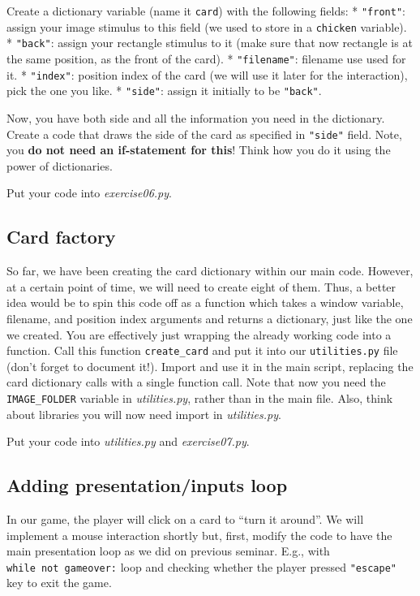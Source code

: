\documentclass[
]{book}
\begin{document}
Create a dictionary variable (name it \texttt{card}) with the following fields:
* \texttt{"front"}: assign your image stimulus to this field (we used to store in a \texttt{chicken} variable).
* \texttt{"back"}: assign your rectangle stimulus to it (make sure that now rectangle is at the same position, as the front of the card).
* \texttt{"filename"}: filename use used for it.
* \texttt{"index"}: position index of the card (we will use it later for the interaction), pick the one you like.
* \texttt{"side"}: assign it initially to be \texttt{"back"}.

Now, you have both side and all the information you need in the dictionary. Create a code that draws the side of the card as specified in \texttt{"side"} field. Note, you \textbf{do not need an if-statement for this}! Think how you do it using the power of dictionaries.

Put your code into \emph{exercise06.py}.

\hypertarget{card-factory}{%
\subsection{Card factory}\label{card-factory}}

So far, we have been creating the card dictionary within our main code. However, at a certain point of time, we will need to create eight of them. Thus, a better idea would be to spin this code off as a function which takes a window variable, filename, and position index arguments and returns a dictionary, just like the one we created. You are effectively just wrapping the already working code into a function. Call this function \texttt{create\_card} and put it into our \texttt{utilities.py} file (don't forget to document it!). Import and use it in the main script, replacing the card dictionary calls with a single function call. Note that now you need the \texttt{IMAGE\_FOLDER} variable in \emph{utilities.py}, rather than in the main file. Also, think about libraries you will now need import in \emph{utilities.py}.

Put your code into \emph{utilities.py} and \emph{exercise07.py}.

\hypertarget{adding-presentationinputs-loop}{%
\subsection{Adding presentation/inputs loop}\label{adding-presentationinputs-loop}}

In our game, the player will click on a card to ``turn it around''. We will implement a mouse interaction shortly but, first, modify the code to have the main presentation loop as we did on previous seminar. E.g., with \texttt{while\ not\ gameover:} loop and checking whether the player pressed \texttt{"escape"} key to exit the game.
\end{document}
